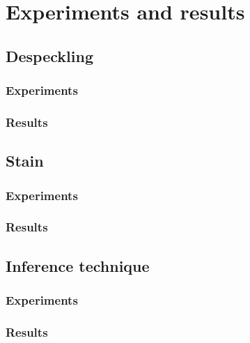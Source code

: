 \documentclass{beamer}
\begin{document}
\section{Experiments and results}

\subsection{Despeckling}

\begin{frame}
\frametitle{Experiments}
\end{frame}

\begin{frame}
\frametitle{Results}
\end{frame}

\subsection{Stain}

\begin{frame}
\frametitle{Experiments}
\end{frame}

\begin{frame}
\frametitle{Results}
\end{frame}

\subsection{Inference technique}

\begin{frame}
\frametitle{Experiments}
\end{frame}

\begin{frame}
\frametitle{Results}
\end{frame}
\end{document}
